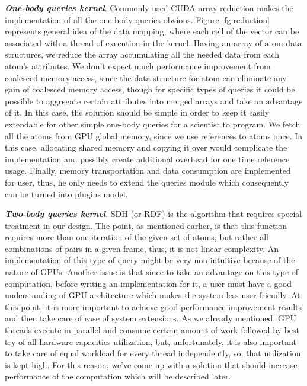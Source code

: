 \documentclass[11pt,a4paper]{report}
\begin{document}
\emph{\textbf{One-body queries kernel}}.
Commonly used CUDA array reduction\cite{gpureduction} makes the implementation of all the one-body queries obvious. Figure \ref{fg:reduction} represents general idea of the data mapping, where each cell of the vector can be associated with a thread of execution in the kernel. Having an array of atom data structures, we reduce the array accumulating all the needed data from each atom's attributes. We don't expect much performance improvement from coalesced memory access, since the data structure for atom can eliminate any gain of coalesced memory access, though for specific types of queries it could be possible to aggregate certain attributes into merged arrays and take an advantage of it. In this case, the solution should be simple in order to keep it easily extendable for other simple one-body queries for a scientist to program. We fetch all the atoms from GPU global memory, since we use references to atoms once. In this case, allocating shared memory and copying it over would complicate the implementation and possibly create additional overhead for one time reference usage. Finally, memory transportation and data consumption are implemented for user, thus, he only needs to extend the queries module which consequently can be turned into plugins model.

\emph{\textbf{Two-body queries kernel}}.
SDH (or RDF) is the algorithm that requires special treatment in our design. The point, as mentioned earlier, is that this function requires more than one iteration of the given set of atoms, but rather all combinations of pairs in a given frame, thus, it is not linear complexity. An implementation of this type of query might be very non-intuitive because of the nature of GPUs. Another issue is that since to take an advantage on this type of computation, before writing an implementation for it, a user must have a good understanding of GPU architecture which makes the system less user-friendly. At this point, it is more important to achieve good performance improvement results and then take care of ease of system extensions. As we already mentioned, GPU threads execute in parallel and consume certain amount of work followed by best try of all hardware capacities utilization, but, unfortunately, it is also important to take care of equal workload for every thread independently, so, that utilization is kept high. For this reason, we've come up with a solution that should increase performance of the computation which will be described later.
\end{document}
